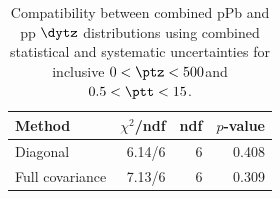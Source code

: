 \begin{table}[htp!]
\centering
\begin{tabular}{|l|r|r|r|}
\hline
Method & $\chi^2$/ndf & ndf & $p$-value \\
\hline
Diagonal & 6.14/6 & 6 & 0.408 \\
Full covariance & 7.13/6 & 6 & 0.309 \\
\hline
\end{tabular}
\caption{Compatibility between combined pPb and pp $\dytz$ distributions using combined statistical and systematic uncertainties for inclusive $0 < \ptz < 500$\GeV and $0.5 < \ptt < 15$\GeV.}
\label{table:chisq_deta}
\end{table}
